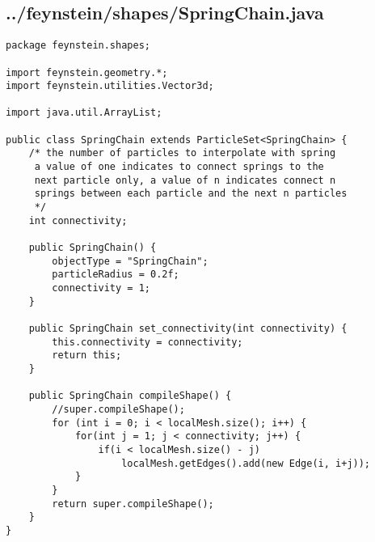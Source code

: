 \subsection*{../feynstein/shapes/SpringChain.java}
\begin{lstlisting}
package feynstein.shapes;

import feynstein.geometry.*;
import feynstein.utilities.Vector3d;

import java.util.ArrayList;

public class SpringChain extends ParticleSet<SpringChain> {
	/* the number of particles to interpolate with spring
	 a value of one indicates to connect springs to the
	 next particle only, a value of n indicates connect n
	 springs between each particle and the next n particles
	 */
	int connectivity;
	
	public SpringChain() {
		objectType = "SpringChain";
		particleRadius = 0.2f;
		connectivity = 1;
	}

	public SpringChain set_connectivity(int connectivity) {
		this.connectivity = connectivity;
		return this;
	}
	
    public SpringChain compileShape() {
		//super.compileShape();
		for (int i = 0; i < localMesh.size(); i++) {
			for(int j = 1; j < connectivity; j++) {
				if(i < localMesh.size() - j)
					localMesh.getEdges().add(new Edge(i, i+j));
			}
		}
		return super.compileShape();
    }
}\end{lstlisting}

